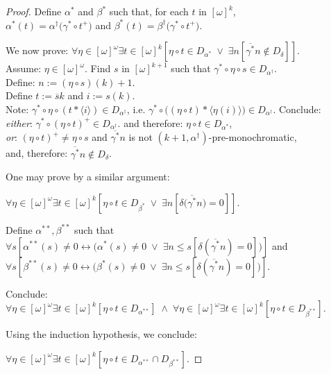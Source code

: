 \documentclass[a4paper]{amsart}
\theoremstyle{plain}
\begin{document}
\begin{proof}
	   Define $\alpha^\ast$ and $\beta^\ast$  such that, for each $t$ in $[\omega]^k$,\\
	    $\alpha^\ast(t) = \alpha^\dag\bigl(\gamma^\ast\circ t^+)$ and $\beta^\ast(t) = \beta^\dag\bigl(\gamma^\ast\circ t^+)$.
	    
	We now prove: $\forall \eta \in [\omega]^\omega \exists t\in [\omega]^k [\eta \circ t \in D_{\alpha^\ast} \;\vee \;\exists n[\overline{\gamma^\ast}n\notin D_\delta]].$
	\\Assume: $\eta\in[\omega]^\omega$. Find $s$ in $[\omega]^{k+1}$ such that $\gamma^\ast \circ \eta \circ s \in D_{\alpha^\dag}$.
	\\Define: $n:=(\eta \circ s)(k) +1$. \\Define $t:= \overline s k$ and $i:= s(k)$. \\Note: $\gamma^\ast\circ \eta \circ (t\ast\langle i \rangle) \in D_{\alpha^\dag}$, i.e. $\gamma^\ast\circ \bigl((\eta \circ t)\ast\langle \eta (i)\rangle\bigr) \in D_{\alpha^\dag}$. Conclude: \\{\it either}: $\gamma^\ast\circ(\eta\circ  t)^+ \in D_{\alpha^\dag}$.
 and therefore: 	$\eta\circ t \in D_{\alpha^\ast}$, \\{\it or}: $(\eta\circ t)^+ \neq  \eta\circ s$ and $\overline {\gamma^\ast}n$ is not $(k+1, \alpha^\dag)$-pre-monochromatic,\\ and, therefore: $\overline {\gamma^\ast} n \notin D_\delta$.
	
	One may  prove by a similar argument:
	
	
	$\forall \eta \in [\omega]^\omega\exists t\in [\omega]^k [\eta \circ t \in D_{\beta^\ast}\;\vee \;\exists n[\delta\bigl(\overline{\gamma^\ast}n\bigr)=0]]$.
	
	
	Define $\alpha^{\ast\ast},\beta^{\ast\ast}$  such that $\forall s[\alpha^{\ast\ast}(s)\neq 0 \leftrightarrow\bigl(\alpha^\ast(s)\neq 0\;\vee\;\exists n\le s[\delta(\overline{\gamma^\ast}n)=0]\bigr)]$ and $\forall s[\beta^{\ast\ast}(s)\neq 0 \leftrightarrow\bigl(\beta^\ast(s)\neq 0\;\vee\;\exists n\le s[\delta(\overline{\gamma^\ast}n)=0]\bigr)]$. 

 Conclude:
	$\forall \eta \in [\omega]^\omega \exists t \in [\omega]^k[\eta \circ t \in D_{\alpha^{\ast\ast}}] \;\wedge\; \forall \eta \in [\omega]^\omega \exists t \in [\omega]^k[\eta \circ t \in D_{\beta^{\ast\ast}}] $.
	
	
	Using the induction hypothesis,  we  conclude:
	
	
	$\forall \eta \in [\omega]^\omega \exists t \in [\omega]^k[\eta \circ t \in D_{\alpha^{\ast\ast}}\cap D_{\beta^{\ast\ast}}]$.
	

\end{proof}
\end{document}
